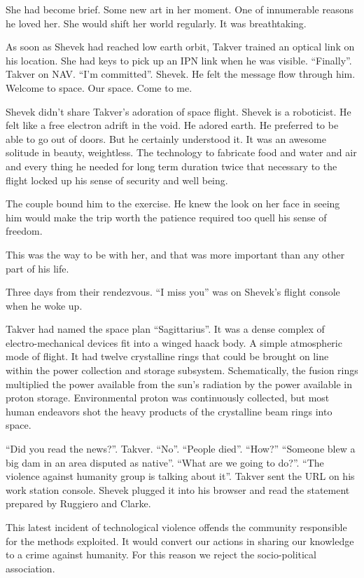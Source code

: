 She had become brief.  Some new art in her moment.  One of innumerable
reasons he loved her.  She would shift her world regularly.  It was
breathtaking.

As soon as Shevek had reached low earth orbit, Takver trained an
optical link on his location.  She had keys to pick up an IPN link
when he was visible.  ``Finally''.  Takver on NAV.  ``I'm committed''.
Shevek.  He felt the message flow through him.  Welcome to space.  Our
space.  Come to me.

Shevek didn't share Takver's adoration of space flight.  Shevek is a
roboticist.  He felt like a free electron adrift in the void.  He
adored earth.  He preferred to be able to go out of doors.  But he
certainly understood it.  It was an awesome solitude in beauty,
weightless.  The technology to fabricate food and water and air and
every thing he needed for long term duration twice that necessary to
the flight locked up his sense of security and well being.

The couple bound him to the exercise.  He knew the look on her face in
seeing him would make the trip worth the patience required too quell
his sense of freedom.  

This was the way to be with her, and that was more important than any
other part of his life.

Three days from their rendezvous.  ``I miss you'' was on Shevek's
flight console when he woke up.

Takver had named the space plan ``Sagittarius''.  It was a dense
complex of electro-mechanical devices fit into a winged haack body.  A
simple atmospheric mode of flight.  It had twelve crystalline rings
that could be brought on line within the power collection and storage
subsystem.  Schematically, the fusion rings multiplied the power
available from the sun's radiation by the power available in proton
storage.  Environmental proton was continuously collected, but most
human endeavors shot the heavy products of the crystalline beam rings
into space.

``Did you read the news?''.  Takver.  ``No''.  ``People died''.
``How?''  ``Someone blew a big dam in an area disputed as native''.
``What are we going to do?''.  ``The violence against humanity group
is talking about it''.  Takver sent the URL on his work station
console.  Shevek plugged it into his browser and read the statement
prepared by Ruggiero and Clarke.

{ \narrower

  This latest incident of technological violence offends the community
  responsible for the methods exploited.  It would convert our actions
  in sharing our knowledge to a crime against humanity.  For this
  reason we reject the socio-political association.

}

